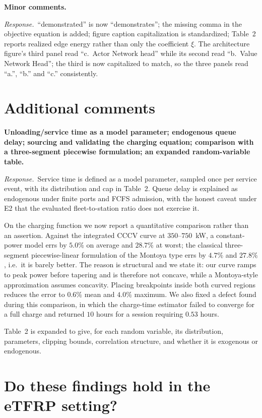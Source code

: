 \documentclass[11pt]{article}
\newcommand{\comment}[1]{\medskip\noindent\textbf{#1}\par\nopagebreak\smallskip}
\newcommand{\reply}{\noindent\textit{Response.}\ }
\begin{document}
\comment{Minor comments.}
\reply ``demonstrated'' is now ``demonstrates''; the missing comma in the
objective equation is added; figure caption capitalization is standardized;
Table~2 reports realized edge energy rather than only the coefficient $\xi$. The
architecture figure's third panel read ``c.\ Actor Network head'' while its
second read ``b.\ Value Network Head''; the third is now capitalized to match,
so the three panels read ``a.'', ``b.'' and ``c.'' consistently.

\section*{Additional comments}

\comment{Unloading/service time as a model parameter; endogenous queue delay;
sourcing and validating the charging equation; comparison with a three-segment
piecewise formulation; an expanded random-variable table.}
\reply Service time is defined as a model parameter, sampled once per service
event, with its distribution and cap in Table~2. Queue delay is explained as
endogenous under finite ports and FCFS admission, with the honest caveat under
E2 that the evaluated fleet-to-station ratio does not exercise it.

On the charging function we now report a quantitative comparison rather than an
assertion. Against the integrated CCCV curve at $350$--$750$~kW, a constant-power
model errs by $5.0\%$ on average and $28.7\%$ at worst; the classical
three-segment piecewise-linear formulation of the Montoya type errs by $4.7\%$
and $27.8\%$, i.e.\ it is barely better. The reason is structural and we state
it: our curve ramps to peak power before tapering and is therefore not concave,
while a Montoya-style approximation assumes concavity. Placing breakpoints
inside both curved regions reduces the error to $0.6\%$ mean and $4.0\%$
maximum. We also fixed a defect found during this comparison, in which the
charge-time estimator failed to converge for a full charge and returned $10$
hours for a session requiring $0.53$ hours.

Table~2 is expanded to give, for each random variable, its distribution,
parameters, clipping bounds, correlation structure, and whether it is exogenous
or endogenous.

\section*{Do these findings hold in the eTFRP setting?}
\end{document}
